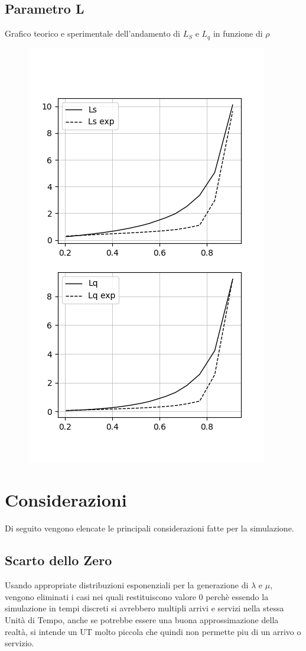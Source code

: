 \documentclass[12pt,a4paper]{article}
\begin{document}
\subsection{Parametro L}
Grafico teorico e sperimentale dell'andamento di $L_S$ e $L_q$ in funzione di $\rho$
\begin{figure}[h]
\centering
\includegraphics[scale=0.8]{L}
\end{figure}


\newpage
\section{Considerazioni}
Di seguito vengono elencate le principali considerazioni fatte per la simulazione.
\subsection{Scarto dello Zero}
Usando appropriate distribuzioni esponenziali per la generazione di $\lambda$ e $\mu$, vengono eliminati i casi nei quali restituiscono valore $0$ perchè essendo la simulazione in tempi discreti si avrebbero multipli arrivi e servizi nella stessa Unità di Tempo, anche se potrebbe essere una buona approssimazione della realtà, si intende un UT molto piccola che quindi non permette piu di un arrivo o servizio.
\end{document}
